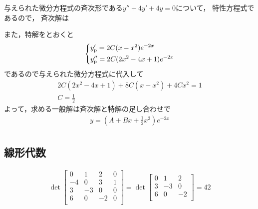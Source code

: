 \begin{ans*}
  与えられた微分方程式の斉次形である$y'' + 4y' + 4y = 0$について，
  特性方程式\mbox{}であるので，
  斉次解は

  また，特解をとおくと
  \begin{gather}
    \begin{dcases*}
      y'_{\rm{p}} = 2C(x-x^2)e^{-2x} \\
      y''_{\rm{p}}= 2C(2x^2-4x+1)e^{-2x}
    \end{dcases*}
  \end{gather}
  であるので与えられた微分方程式に代入して
  \begin{gather}
    2C(2x^2 - 4x + 1) + 8C(x-x^2) + 4Cx^2 = 1 \\
    C = \frac{1}{2} 
  \end{gather}
  よって，求める一般解は斉次解と特解の足し合わせで
  \begin{gather}
    y = \left(A + Bx + \frac{1}{2}x^2\right)e^{-2x} \\
  \end{gather}
\end{ans*}



\subsection{線形代数}
\begin{ans*}
  \begin{align}
    \det 
    \begin{bmatrix}
      0 & 1 & 2 & 0 \\
      -4 & 0 & 3 & 1 \\
      3 & -3 & 0 & 0 \\
      6 & 0 & -2 & 0 \\
    \end{bmatrix}
    = \det
    \begin{bmatrix}
      0  & 1  & 2  \\
      3  & -3 & 0  \\
      6  & 0  & -2 \\
    \end{bmatrix}
    = 42
  \end{align}
\end{ans*}


